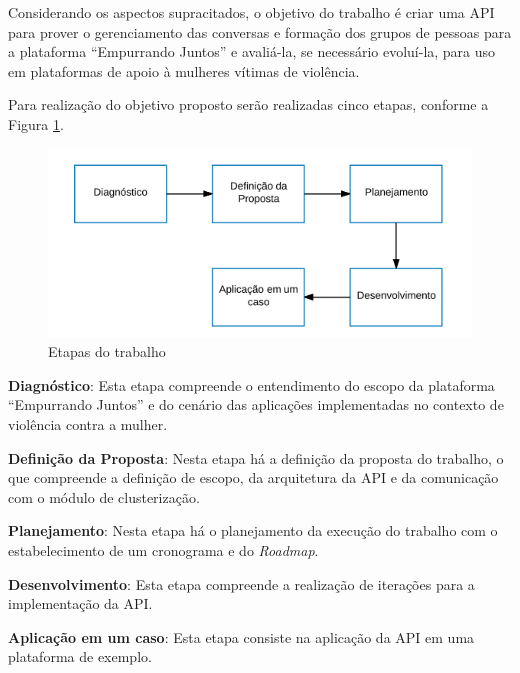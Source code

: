 Considerando os aspectos supracitados, o objetivo do trabalho é criar uma API para prover o gerenciamento das conversas e formação
dos grupos de pessoas para a plataforma ``Empurrando Juntos'' e avaliá-la, se necessário evoluí-la, para uso 
em plataformas de apoio à mulheres vítimas de violência.



Para realização do objetivo proposto serão realizadas cinco etapas, conforme a Figura \ref{fig:etapas_trabalho}.

\begin{figure}[h!]
\centering
\includegraphics[scale=0.6]{figuras/etapas.png}
\caption{Etapas do trabalho}
\label{fig:etapas_trabalho}
\end{figure}

\noindent \textbf{Diagnóstico}: Esta etapa compreende o entendimento do escopo da plataforma ``Empurrando Juntos'' e do cenário das 
aplicações implementadas no contexto de violência contra a mulher.

\noindent \textbf{Definição da Proposta}: Nesta etapa há a definição da proposta do trabalho, o que compreende a definição de escopo, 
da arquitetura da API e da comunicação com o módulo de clusterização.

\noindent \textbf{Planejamento}: Nesta etapa há o planejamento da execução do trabalho com o estabelecimento
de um cronograma e do \textit{Roadmap}.

\noindent \textbf{Desenvolvimento}: Esta etapa compreende a realização de iterações para a implementação da API.

\noindent \textbf{Aplicação em um caso}: Esta etapa consiste na aplicação da API em uma plataforma de exemplo.

